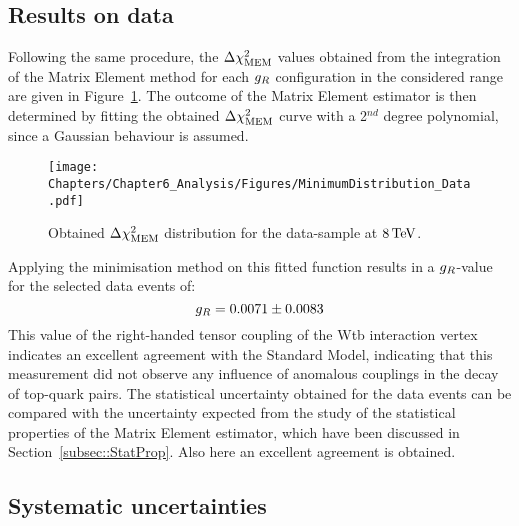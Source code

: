 \subsection{Results on data}
Following the same procedure, the $\Delta \chi^{2}_{\textrm{MEM}}$ values obtained from the integration of the Matrix Element method for each $g_{R}$ configuration in the considered range are given in Figure~\ref{fig::MinData}.
The outcome of the Matrix Element estimator is then determined by fitting the obtained $\Delta \chi^{2}_{\textrm{MEM}}$ curve with a 2$^{nd}$ degree polynomial, since a Gaussian behaviour is assumed.
\begin{figure}[h!t]
 \centering
 \texttt{[image: Chapters/Chapter6\_Analysis/Figures/MinimumDistribution\_Data.pdf]}
 \caption{Obtained $\Delta \chi^{2}_{\textrm{MEM}}$ distribution for the data-sample at $8 \, \mathrm{TeV}$.} \label{fig::MinData}
\end{figure}

Applying the minimisation method on this fitted function results in a $g_{R}$-value for the selected data events of:
\begin{equation} \label{eq::DataResult}
 g_{R} = 0.0071 \pm 0.0083
\end{equation}
This value of the right-handed tensor coupling of the Wtb interaction vertex indicates an excellent agreement with the Standard Model, indicating that this measurement did not observe any influence of anomalous couplings in the decay of top-quark pairs.
The statistical uncertainty obtained for the data events can be compared with the uncertainty expected from the study of the statistical properties of the Matrix Element estimator, which have been discussed in Section~\ref{subsec::StatProp}.
Also here an excellent agreement is obtained.

\subsection{Systematic uncertainties}

